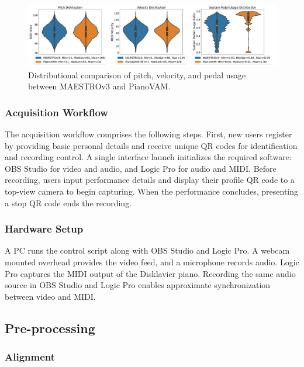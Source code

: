 \documentclass{article}
\begin{document}
\begin{figure}
    \centering
    \includegraphics[width=1\linewidth]{Images/combined_violinplot.pdf}
    \vspace{-7mm}    
    \caption{Distributional comparison of pitch, velocity, and pedal usage between MAESTROv3 and PianoVAM.}
    \label{fig:combined-violinplot}
\end{figure}


\subsubsection{Acquisition Workflow}
The acquisition workflow comprises the following steps. First, new users register by providing basic personal details and receive unique QR codes for identification and recording control. A single interface launch initializes the required software: OBS Studio for video and audio, and Logic Pro for audio and MIDI. Before recording, users input performance details and display their profile QR code to a top-view camera to begin capturing. When the performance concludes, presenting a stop QR code ends the recording.


\subsubsection{Hardware Setup} 
A PC runs the control script along with OBS Studio and Logic Pro. A webcam mounted overhead provides the video feed, and a microphone records audio. Logic Pro captures the MIDI output of the Disklavier piano. Recording the same audio source in OBS Studio and Logic Pro enables approximate synchronization between video and MIDI.

\subsection{Pre-processing}
\subsubsection{Alignment}\label{subsubsec:alignment}
\end{document}
